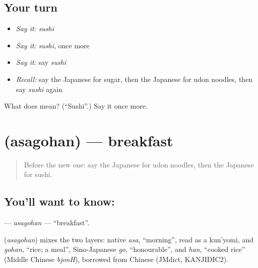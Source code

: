 \subsection*{Your turn}
\begin{itemize}
\raggedright
  \item \emph{Say it:} \emph{sushi}
  \item \emph{Say it:} \emph{sushi}, once more
  \item \emph{Say it:} say \emph{sushi}
  \item \emph{Recall:} say the Japanese for sugar, then the Japanese for udon noodles, then say \emph{sushi} again
\end{itemize}

\begin{tcolorbox}[breakable,colback=teal!4,colframe=teal!35!black,title={Before you move on}]
What does  mean? (\textquotedblleft{}Sushi\textquotedblright{}.) Say it once more.
\end{tcolorbox}
\section[\texorpdfstring{\ja{あさごはん} (asagohan)}{あさごはん (asagohan)}]{ (asagohan) — breakfast}

\label{lesson:JA-C35-asagohan}



\begin{quote}
Before the new one: say the Japanese for udon noodles, then the Japanese for sushi.
\end{quote}

\subsection*{You'll want to know: }
\textbf{} — \emph{asagohan} — \textquotedblleft{}breakfast\textquotedblright{}.

\begin{cousinweb}
\textbf{} (\emph{asagohan}) mixes the two layers: native \emph{asa}, \textquotedblleft{}morning\textquotedblright{}, read as a kun'yomi, and \emph{gohan}, \textquotedblleft{}rice; a meal\textquotedblright{}, Sino-Japanese \emph{go}, \textquotedblleft{}honourable\textquotedblright{}, and \emph{han}, \textquotedblleft{}cooked rice\textquotedblright{} (Middle Chinese \emph{bjonH}), borrowed from Chinese (JMdict, KANJIDIC2).
\end{cousinweb}

